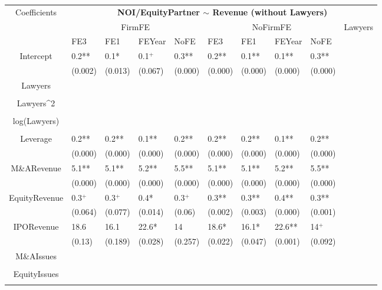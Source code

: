 \documentclass{article}
\begin{document}
\begin{table}[H]
\centering
\begin{tabular}{|clllllllll|}
\hline
\multirow{3}{*}{Coefficients} & \multicolumn{9}{c|}{\textbf{NOI/EquityPartner $\sim$ Revenue (without Lawyers)}} \\
\cline{2-10}
& \multicolumn{4}{c}{FirmFE} & \multicolumn{4}{c}{NoFirmFE} & \multirow{2}{*}{Lawyers} \\
\cline{2-9}
& FE3 & FE1 & FEYear & NoFE & FE3 & FE1 & FEYear & NoFE &  \\
\hline
 
Intercept & 0.2** & 0.1* & 0.1$^{+}$ & 0.3** & 0.2** & 0.1** & 0.1** & 0.3** & \\ 
   & (0.002) & (0.013) & (0.067) & (0.000) & (0.000) & (0.000) & (0.000) & (0.000) & \\ 
  Lawyers &  &  &  &  &  &  &  &  & \\ 
   &  &  &  &  &  &  &  &  & \\ 
  Lawyers^2 &  &  &  &  &  &  &  &  & \\ 
   &  &  &  &  &  &  &  &  & \\ 
  log(Lawyers) &  &  &  &  &  &  &  &  & \\ 
   &  &  &  &  &  &  &  &  & \\ 
  Leverage & 0.2** & 0.2** & 0.1** & 0.2** & 0.2** & 0.2** & 0.1** & 0.2** & \\ 
   & (0.000) & (0.000) & (0.000) & (0.000) & (0.000) & (0.000) & (0.000) & (0.000) & \\ 
  M\&ARevenue & 5.1** & 5.1** & 5.2** & 5.5** & 5.1** & 5.1** & 5.2** & 5.5** & \\ 
   & (0.000) & (0.000) & (0.000) & (0.000) & (0.000) & (0.000) & (0.000) & (0.000) & \\ 
  EquityRevenue & 0.3$^{+}$ & 0.3$^{+}$ & 0.4* & 0.3$^{+}$ & 0.3** & 0.3** & 0.4** & 0.3** & \\ 
   & (0.064) & (0.077) & (0.014) & (0.06) & (0.002) & (0.003) & (0.000) & (0.001) & \\ 
  IPORevenue & 18.6 & 16.1 & 22.6* & 14 & 18.6* & 16.1* & 22.6** & 14$^{+}$ & \\ 
   & (0.13) & (0.189) & (0.028) & (0.257) & (0.022) & (0.047) & (0.001) & (0.092) & \\ 
  M\&AIssues &  &  &  &  &  &  &  &  & \\ 
   &  &  &  &  &  &  &  &  & \\ 
  EquityIssues &  &  &  &  &  &  &  &  & \\ 
   &  &  &  &  &  &  &  &  & \\ 

\end{tabular}
\end{table}
\end{document}
